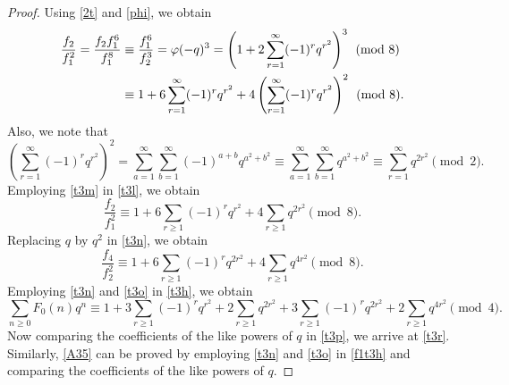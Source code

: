 \documentclass[12pt]{article}
\numberwithin{equation}{section}
\theoremstyle{definition}
\theoremstyle{remark}
\numberwithin{equation}{section}
\begin{document}
\begin{proof}
Using \eqref{2t} and \eqref{phi}, we obtain 
\begin{align}
\dfrac{f_2}{f_1^2}
=
\dfrac{f_2f_1^6}{f_1^8}&\equiv
\dfrac{f_1^6}{f_2^3}
=
\varphi(-q)^3 =\left(
1+2\sum_{r=1}^\infty(-1)^r q^{r^2}
\right)^3 \pmod 8\notag\\
&\label{t3l}\equiv
1
+
6\sum_{r=1}^\infty(-1)^r q^{r^2}
+
4\left(
\sum_{r=1}^\infty(-1)^r q^{r^2}
\right)^2\pmod 8 .
\end{align}
Also, we note that
\begin{equation}\label{t3m}
\left(
\sum_{r=1}^\infty(-1)^r q^{r^2}
\right)^2
=
\sum_{a=1}^{\infty}\sum_{b=1}^\infty(-1)^{a+b}q^{a^2+b^2} 
\equiv
\sum_{a=1}^\infty\sum_{b=1}^\infty q^{a^2+b^2}
\equiv
\sum_{r=1}^\infty q^{2r^2}
\pmod 2.
\end{equation}
Employing  \eqref{t3m} in \eqref{t3l},  we obtain
\begin{equation}\label{t3n}
\dfrac{f_2}{f_1^2}
\equiv
1
+
6\sum_{r\geq 1}(-1)^r q^{r^2}
+
4\sum_{r\geq 1}q^{2r^2}
\pmod 8 .
\end{equation}
Replacing $q$ by $q^2$ in \eqref{t3n}, we obtain
\begin{equation}\label{t3o}
\dfrac{f_4}{f_2^2}
\equiv
1
+
6\sum_{r\geq 1}(-1)^r q^{2r^2}
+
4\sum_{r\geq 1}q^{4r^2}
\pmod 8 .
\end{equation}
Employing \eqref{t3n} and \eqref{t3o} in \eqref{t3h}, we obtain
\begin{equation}\label{t3p}
\sum_{n\geq 0}F_0(n)q^n
\equiv
1
+
3\sum_{r\geq 1}(-1)^r q^{r^2}
+
2\sum_{r\geq 1}q^{2r^2} 
+3\sum_{r\geq 1}(-1)^r q^{2r^2}
+2\sum_{r\geq 1}q^{4r^2}
\pmod 4 .
\end{equation}
Now comparing the coefficients of the like powers of $q$ in \eqref{t3p}, we arrive at \eqref{t3r}. Similarly, \eqref{A35} can be proved by employing \eqref{t3n} and \eqref{t3o} in \eqref{f1t3h}  and comparing the  coefficients of the like powers of $q$.
\end{proof}
\end{document}
